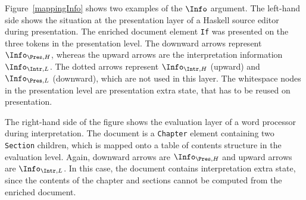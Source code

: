 \bc
Figure~\ref{mappingInfo} shows two examples of the $\Info$ argument. The left-hand side shows the situation at the presentation layer of a Haskell source editor during presentation.  The enriched document element \verb|If|  was presented on the three tokens in the presentation level. The downward arrows represent $\Info_{\Pres,H}$, whereas the upward arrows are the interpretation information $\Info_{\Intr, L}$. The dotted arrows represent $\Info_{\Intr,H}$ (upward) and $\Info_{\Pres,L}$ (downward), which are not used in this layer. The whitespace nodes in the presentation level are presentation extra state, that has to be reused on presentation. 

The right-hand side of the figure shows the evaluation layer of a word processor during interpretation. The document is a \verb|Chapter| element containing two \verb|Section| children, which is mapped onto a table of contents structure in the evaluation level. Again, downward arrows are $\Info_{\Pres,H}$ and upward arrows are $\Info_{\Intr,L}$.  In this case, the document contains interpretation extra state, since the contents of the chapter and sections cannot be computed from the enriched document.  

